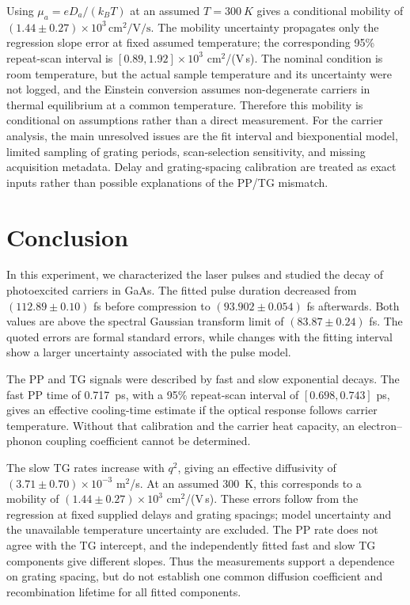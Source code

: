\documentclass[11pt,a4paper]{article}
\begin{document}
Using $\mu_a=eD_a/(k_BT)$ at an assumed $T=\SI{300}{K}$ gives a conditional mobility of $(1.44\pm0.27)\times10^3\,\si{\centi\metre\squared\per\volt\per\second}$. The mobility uncertainty propagates only the regression slope error at fixed assumed temperature; the corresponding 95\% repeat-scan interval is $[0.89,1.92]\times10^3$ cm$^2$/(V\,s). The nominal condition is room temperature, but the actual sample temperature and its uncertainty were not logged, and the Einstein conversion assumes non-degenerate carriers in thermal equilibrium at a common temperature. Therefore this mobility is conditional on assumptions rather than a direct measurement. For the carrier analysis, the main unresolved issues are the fit interval and biexponential model, limited sampling of grating periods, scan-selection sensitivity, and missing acquisition metadata. Delay and grating-spacing calibration are treated as exact inputs rather than possible explanations of the PP/TG mismatch.

\section{Conclusion}
In this experiment, we characterized the laser pulses and studied the decay of photoexcited carriers in GaAs. The fitted pulse duration decreased from $(112.89\pm0.10)$ fs before compression to $(93.902\pm0.054)$ fs afterwards. Both values are above the spectral Gaussian transform limit of $(83.87\pm0.24)$ fs. The quoted errors are formal standard errors, while changes with the fitting interval show a larger uncertainty associated with the pulse model.

The PP and TG signals were described by fast and slow exponential decays. The fast PP time of \SI{0.717}{ps}, with a 95\% repeat-scan interval of $[0.698,0.743]$ ps, gives an effective cooling-time estimate if the optical response follows carrier temperature. Without that calibration and the carrier heat capacity, an electron--phonon coupling coefficient cannot be determined.

The slow TG rates increase with $q^2$, giving an effective diffusivity of $(3.71\pm0.70)\times10^{-3}$ m$^2$/s. At an assumed \SI{300}{K}, this corresponds to a mobility of $(1.44\pm0.27)\times10^3$ cm$^2$/(V\,s). These errors follow from the regression at fixed supplied delays and grating spacings; model uncertainty and the unavailable temperature uncertainty are excluded. The PP rate does not agree with the TG intercept, and the independently fitted fast and slow TG components give different slopes. Thus the measurements support a dependence on grating spacing, but do not establish one common diffusion coefficient and recombination lifetime for all fitted components.
\end{document}
